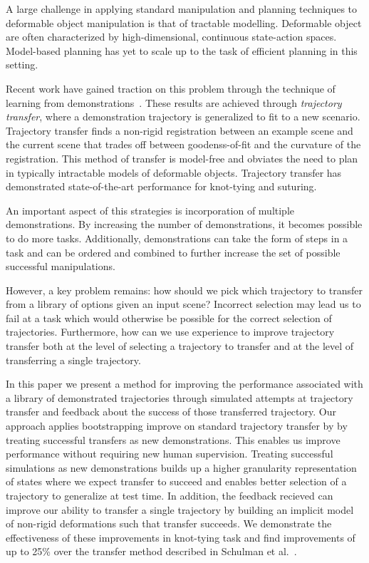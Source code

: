 A large challenge in applying standard manipulation and planning techniques to
deformable object manipulation is that of tractable modelling. Deformable object 
are often characterized by high-dimensional, continuous state-action spaces. Model-based 
planning has yet to scale up to the task of efficient planning in this
setting.

Recent work have gained traction on this problem through the technique of 
learning from demonstrations~\cite{Schulmanetal_ISRR2013,Schulmanetal_IROS2013}.
These results are achieved through \emph{trajectory transfer}, where a demonstration
trajectory is generalized to fit to a new scenario. Trajectory transfer finds a non-rigid
registration between an example scene and the current scene that trades off between
goodenss-of-fit and the curvature of the registration. 
This method of transfer is model-free and obviates the need to plan in typically
intractable models of deformable objects. Trajectory transfer has demonstrated 
state-of-the-art performance for knot-tying and suturing.

An important aspect of this strategies is incorporation of multiple demonstrations. 
By increasing the number of demonstrations, it becomes possible to do more
tasks. Additionally, demonstrations can take the form of steps in a task and can be
ordered and combined to further increase the set of possible successful manipulations.

However, a key problem remains: how should we pick which trajectory to transfer
from a library of options given an input scene? Incorrect selection may lead us
to fail at a task which would otherwise be possible for the correct selection of 
trajectories. Furthermore, how can we use experience to improve trajectory transfer 
both at the level of selecting a trajectory to transfer and at the level of transferring
a single trajectory.

In this paper we present a method for improving the performance associated with
a library of demonstrated trajectories through simulated attempts at trajectory
transfer and feedback about the success of those transferred trajectory. Our approach
applies bootstrapping improve on standard trajectory transfer by 
by treating successful transfers as new demonstrations. This enables us improve
performance without requiring new human supervision. Treating successful simulations
as new demonstrations builds up a higher granularity representation of states where
we expect transfer to succeed and enables better selection of a trajectory to 
generalize at test time. In addition, the feedback recieved can improve our ability
to transfer a single trajectory by building an implicit model of non-rigid 
deformations such that transfer succeeds. We demonstrate the effectiveness 
of these improvements in knot-tying task and find improvements  
of up to 25\% over the transfer method described in Schulman et al.~\cite{Schulmanetal_ISRR2013}.

